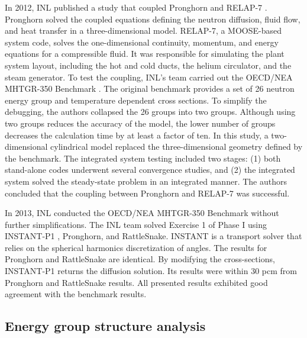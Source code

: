In 2012, \gls{INL} published a study \cite{j_ortensi_initial_2012} that coupled Pronghorn and RELAP-7 \cite{andrs_relap-7_2012}.
Pronghorn solved the coupled equations defining the neutron diffusion, fluid flow, and heat transfer in a three-dimensional model.
RELAP-7, a MOOSE-based system code, solves the one-dimensional continuity, momentum, and energy equations for a compressible fluid.
It was responsible for simulating the plant system layout, including the hot and cold ducts, the helium circulator, and the steam generator.
To test the coupling, INL's team carried out the OECD/NEA MHTGR-350 Benchmark \cite{oecd_nea_coupled_2020}.
The original benchmark provides a set of 26 neutron energy group and temperature dependent cross sections.
To simplify the debugging, the authors collapsed the 26 groups into two groups.
Although using two groups reduces the accuracy of the model, the lower number of groups decreases the calculation time by at least a factor of ten.
In this study, a two-dimensional cylindrical model replaced the three-dimensional geometry defined by the benchmark.
The integrated system testing included two stages: (1) both stand-alone codes underwent several convergence studies, and (2) the integrated system solved the steady-state problem in an integrated manner.
The authors concluded that the coupling between Pronghorn and RELAP-7 was successful.

In 2013, \gls{INL} conducted the OECD/NEA MHTGR-350 Benchmark \cite{strydom_inl_2013} without further simplifications.
The \gls{INL} team solved Exercise 1 of Phase I using INSTANT-P1 \cite{wang_krylov_2011}, Pronghorn, and RattleSnake.
INSTANT is a transport solver that relies on the spherical harmonics discretization of angles.
The results for Pronghorn and RattleSnake are identical.
By modifying the cross-sections, INSTANT-P1 returns the diffusion solution.
Its results were within 30 pcm from Pronghorn and RattleSnake results.
All presented results exhibited good agreement with the benchmark results.

\subsection{Energy group structure analysis}

